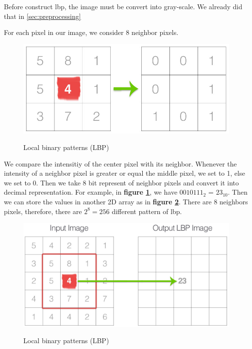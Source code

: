 \documentclass[a4paper, 12pt]{article}
\begin{document}
	Before construct lbp, the image must be convert into gray-scale. We already did that in \ref{sec:preprocessing}
	
	For each pixel in our image, we consider 8 neighbor pixels.
	\begin{figure}[H]
		\centering
		\includegraphics[width=1\linewidth]{./figure/lbp_thresholding.jpg}
		\caption[]{Local binary patterns (LBP)}
		\label{fig:lbp}
		\cite{lbptutorial}
	\end{figure}
	We compare the intensitiy of the center pixel with its neighbor. Whenever the intensity of a neighbor pixel is greater or equal the middle pixel, we set to 1, else we set to 0. Then we take 8 bit represent of neighbor pixels and convert it into decimal representation. For example, in \textbf{figure \ref{fig:lbp}}, we have $0010111_2$ = $23_10$. Then we can store the values in another 2D array as in \textbf{figure \ref{fig:lbp_to_output}}. There are 8 neighbors pixels, therefore, there are $2^8 = 256$ different pattern of lbp. 
	
	\begin{figure}[H]
		\centering
		\includegraphics[width=1\linewidth]{./figure/lbp_to_output.jpg}
		\caption[]{Local binary patterns (LBP)}
		\label{fig:lbp_to_output}
		\cite{lbptutorial}
	\end{figure}
	
\end{document}
